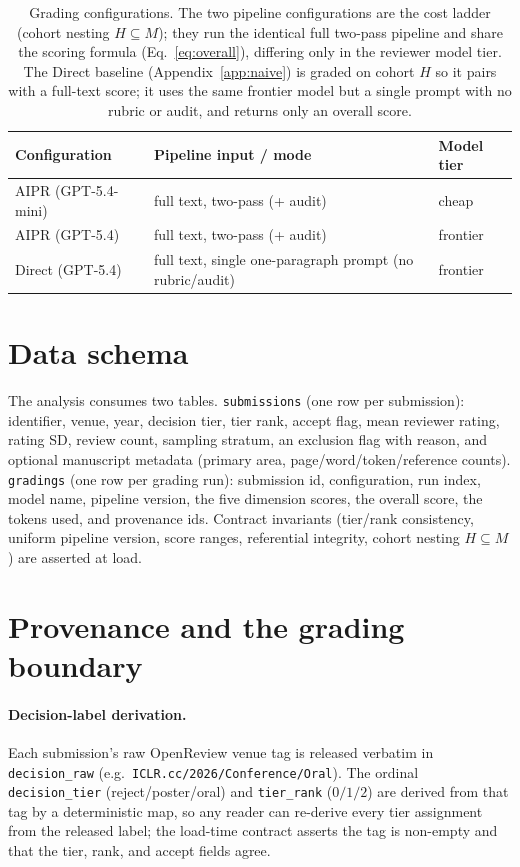 \begin{table}[h]
  \centering
  \caption{Grading configurations. The two pipeline configurations are the cost
  ladder (cohort nesting $H\subseteq M$); they run the identical full two-pass
  pipeline and share the scoring formula (Eq.~\ref{eq:overall}), differing only in
  the reviewer model tier. The Direct baseline (Appendix~\ref{app:naive}) is graded on
  cohort $H$ so it pairs with a full-text score; it uses the same frontier model
  but a single prompt with no rubric or audit, and returns only an overall score.}
  \label{tab:configs-app}
  \begin{tabular}{lll}
    \toprule
    Configuration & Pipeline input / mode & Model tier \\
    \midrule
    AIPR (GPT-5.4-mini)  & full text, two-pass (+ audit)     & cheap \\
    AIPR (GPT-5.4)       & full text, two-pass (+ audit)     & frontier \\
    \midrule
    Direct (GPT-5.4) & full text, single one-paragraph prompt (no rubric/audit) & frontier \\
    \bottomrule
  \end{tabular}
\end{table}

\section{Data schema}
\label{app:schema}
The analysis consumes two tables. \texttt{submissions} (one row per submission):
identifier, venue, year, decision tier, tier rank, accept flag, mean reviewer
rating, rating SD, review count, sampling stratum, an exclusion flag with reason,
and optional manuscript metadata (primary area, page/word/token/reference counts).
\texttt{gradings} (one row per grading run): submission id, configuration, run
index, model name, pipeline version, the five dimension scores, the overall score,
the tokens used, and provenance ids. Contract invariants (tier/rank consistency,
uniform pipeline version, score ranges, referential integrity, cohort nesting
$H\subseteq M$) are asserted at load.

\section{Provenance and the grading boundary}
\label{app:provenance}
\paragraph{Decision-label derivation.} Each submission's raw OpenReview venue tag
is released verbatim in \texttt{decision\_raw} (e.g.\ \texttt{ICLR.cc/2026/Conference/Oral}).
The ordinal \texttt{decision\_tier} (reject/poster/oral) and \texttt{tier\_rank}
($0/1/2$) are derived from that tag by a deterministic map, so any reader can
re-derive every tier assignment from the released label; the load-time contract
asserts the tag is non-empty and that the tier, rank, and accept fields agree.

